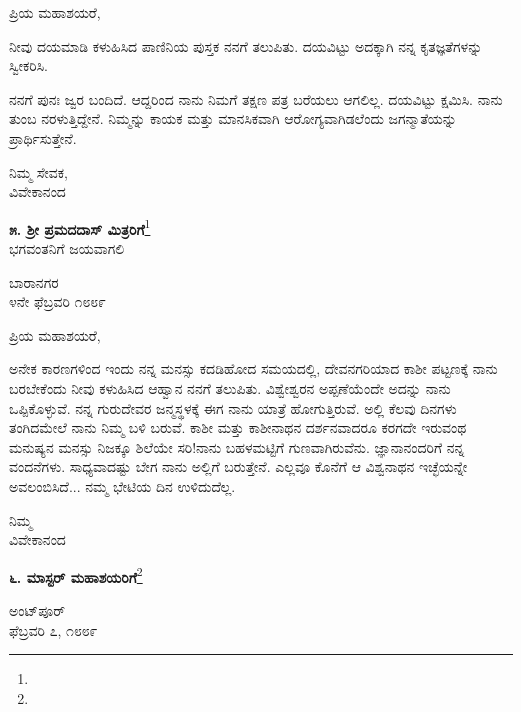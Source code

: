 \noindent
ಪ್ರಿಯ ಮಹಾಶಯರೆ,

ನೀವು ದಯಮಾಡಿ ಕಳುಹಿಸಿದ ಪಾಣಿನಿಯ ಪುಸ್ತಕ ನನಗೆ ತಲುಪಿತು. ದಯವಿಟ್ಟು ಅದಕ್ಕಾಗಿ ನನ್ನ ಕೃತಜ್ಞತೆಗಳನ್ನು ಸ್ವೀಕರಿಸಿ.

ನನಗೆ ಪುನಃ ಜ್ವರ ಬಂದಿದೆ. ಆದ್ದರಿಂದ ನಾನು ನಿಮಗೆ ತಕ್ಷಣ ಪತ್ರ ಬರೆಯಲು ಆಗಲಿಲ್ಲ. ದಯವಿಟ್ಟು ಕ್ಷಮಿಸಿ. ನಾನು ತುಂಬ ನರಳುತ್ತಿದ್ದೇನೆ. ನಿಮ್ಮನ್ನು ಕಾಯಕ ಮತ್ತು ಮಾನಸಿಕವಾಗಿ ಆರೋಗ್ಯವಾಗಿಡಲೆಂದು ಜಗನ್ಮಾತೆಯನ್ನು ಪ್ರಾರ್ಥಿಸುತ್ತೇನೆ.

{\flushright
ನಿಮ್ಮ ಸೇವಕ,\\ವಿವೇಕಾನಂದ\par}
\newpage

\begin{center}
\textbf{೫. ಶ‍್ರೀ ಪ್ರಮದದಾಸ್‌ ಮಿತ್ರರಿಗೆ}\footnote{}\\ ಭಗವಂತನಿಗೆ ಜಯವಾಗಲಿ
\end{center}

\vspace{-0.4cm}

\begin{flushright}
ಬಾರಾನಗರ\\೪ನೇ ಫೆಬ್ರವರಿ ೧೮೮೯
\end{flushright}

\noindent
ಪ್ರಿಯ ಮಹಾಶಯರೆ,

ಅನೇಕ ಕಾರಣಗಳಿಂದ ಇಂದು ನನ್ನ ಮನಸ್ಸು ಕದಡಿಹೋದ ಸಮಯದಲ್ಲಿ, ದೇವನಗರಿಯಾದ ಕಾಶೀ ಪಟ್ಟಣಕ್ಕೆ ನಾನು ಬರಬೇಕೆಂದು ನೀವು ಕಳುಹಿಸಿದ ಆಹ್ವಾನ ನನಗೆ ತಲುಪಿತು. ವಿಶ್ವೇಶ್ವರನ ಅಪ್ಪಣೆಯೆಂದೇ ಅದನ್ನು ನಾನು ಒಪ್ಪಿಕೊಳ್ಳುವೆ. ನನ್ನ ಗುರುದೇವರ ಜನ್ಮಸ್ಥಳಕ್ಕೆ ಈಗ ನಾನು ಯಾತ್ರೆ ಹೋಗುತ್ತಿರುವೆ. ಅಲ್ಲಿ ಕೆಲವು ದಿನಗಳು ತಂಗಿದಮೇಲೆ ನಾನು ನಿಮ್ಮ ಬಳಿ ಬರುವೆ. ಕಾಶೀ ಮತ್ತು ಕಾಶೀನಾಥನ ದರ್ಶನವಾದರೂ ಕರಗದೇ ಇರುವಂಥ ಮನುಷ್ಯನ ಮನಸ್ಸು ನಿಜಕ್ಕೂ ಶಿಲೆಯೇ ಸರಿ!ನಾನು ಬಹಳಮಟ್ಟಿಗೆ ಗುಣವಾಗಿರುವೆನು. ಜ್ಞಾನಾನಂದರಿಗೆ ನನ್ನ ವಂದನೆಗಳು. ಸಾಧ್ಯವಾದಷ್ಟು ಬೇಗ ನಾನು ಅಲ್ಲಿಗೆ ಬರುತ್ತೇನೆ. ಎಲ್ಲವೂ ಕೊನೆಗೆ ಆ ವಿಶ್ವನಾಥನ ಇಚ್ಛೆಯನ್ನೇ ಅವಲಂಬಿಸಿದೆ... ನಮ್ಮ ಭೇಟಿಯ ದಿನ ಉಳಿದುದೆಲ್ಲ.

\vspace{-0.3cm}

{\flushright
ನಿಮ್ಮ\\ವಿವೇಕಾನಂದ\par}

\vspace{-0.3cm}

\begin{center}
\textbf{೬. ಮಾಸ್ಟರ್ ಮಹಾಶಯರಿಗೆ}\footnote{}
\end{center}

\vspace{-0.5cm}

\begin{flushright}
ಅಂಟ್‌ಪೂರ್‌\\ಫೆಬ್ರವರಿ ೭, ೧೮೮೯
\end{flushright}

